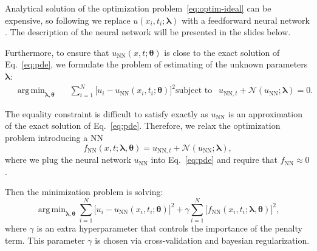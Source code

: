 \documentclass{beamer}
\def\\{}%
\renewcommand{\vec}[1]{\boldsymbol{#1}}
\newcommand{\VTheta}{\ensuremath{\vec{\theta}}}
\newcommand{\VLambda}{\ensuremath{\vec{\lambda}}}
\DeclareMathOperator*{\argmin}{arg\,min}
\newcommand{\UNN}[1][\text{NN}]{u_{#1}}
\newcommand{\FNN}[1][\text{NN}]{f_{#1}}
\newcommand{\NonlinOp}{\mathcal N\!}
\begin{document}
\begin{frame}

Analytical solution of the optimization problem~\eqref{eq:optim-ideal} can be expensive, so following \cite{raissi2017pinnII}
we replace  $u(x_i, t_i; \VLambda)$ with a 
feedforward neural network \cite{goodfellow2016deep}. The description of the neural network will be presented in the slides below.

Furthermore, to ensure that $\UNN( x, t; \VTheta)$
is close to the exact solution of Eq.~\eqref{eq:pde}, we formulate the problem of estimating of the unknown parameters
$\VLambda$:
\begin{subequations}
\label{eq:optim}
\begin{align*}
    &\argmin_{\VLambda, \VTheta} \quad \ \ 
        \sum_{i=1}^N \big[u_i - \UNN(x_i, t_i; \VTheta)\big]^2  \\
    &\text{subject to } \ \ \UNN[\text{NN}, t]  + \NonlinOp(\UNN; \VLambda) = 0.
\end{align*}
\end{subequations}

\end{frame}

\begin{frame}
The equality constraint is difficult to satisfy exactly as
$u_{\text{NN}}$ is an approximation of the exact solution of
Eq.~\eqref{eq:pde}.
Therefore, we relax the optimization problem introducing a NN
\begin{equation*}
    \FNN(x, t; \VLambda, \VTheta) =
        u_{\text{NN}, t} + \NonlinOp(u_{\text{NN}}; \VLambda),
\end{equation*}
where we plug the neural network $\UNN$ into Eq.~\eqref{eq:pde} and
require that $\FNN \approx 0$.

Then the minimization problem is solving:
\begin{equation*}
    \argmin_{\VLambda, \VTheta}
    \sum_{i=1}^N \big[ u_i - \UNN(x_i, t_i; \VTheta)\big ]^2
    +\gamma \sum_{i=1}^N \big[ \FNN(x_i, t_i; \VLambda, \VTheta) \big]^2,
\end{equation*}
where $\gamma$ is an extra hyperparameter that controls the importance of the
penalty term.
This parameter $\gamma$ is chosen via cross-validation and bayesian regularization.
    
\end{frame}
\end{document}
